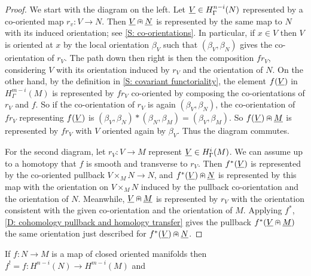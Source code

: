 \begin{proof}
	We start with the diagram on the left.
	Let $\underline{V} \in H^{n-i}_\Gamma(N)$ represented by a co-oriented map $r_v \colon V \to N$.
	Then $\underline{V}\nplus\underline{N}$ is represented by the same map to $N$ with its induced orientation; see \cref{S: co-orientations}.
	In particular, if $x \in V$ then $V$ is oriented at $x$ by the local orientation $\beta_V$ such that $(\beta_V,\beta_N)$ gives the co-orientation of $r_V$.
	The path down then right is then the composition $fr_V$, considering $V$ with its orientation induced by $r_V$ and the orientation of $N$.
	On the other hand, by the definition in \cref{S: covariant functoriality}, the element $f(\underline{V})$ in $H^{m-i}_\Gamma(M)$ is represented by $fr_V$ co-oriented by composing the co-orientations of $r_V$ and $f$.
	So if the co-orientation of $r_V$ is again $(\beta_V,\beta_N)$, the co-orientation of $fr_V$ representing $f(\underline{V})$ is $(\beta_V,\beta_N)*(\beta_N,\beta_M) = (\beta_V,\beta_M)$.
	So $f(\underline{V})\nplus \underline{M}$ is represented by $fr_V$ with $V$ oriented again by $\beta_V$.
	Thus the diagram commutes.

	For the second diagram, let $r_V \colon V \to M$ represent $\underline{V} \in H^{i}_\Gamma(M)$.
	We can assume up to a homotopy that $f$ is smooth and transverse to $r_V$.
	Then $f^*(\underline{V})$ is represented by the co-oriented pullback $V \times_M N \to N$, and $f^*(\underline{V})\nplus\underline{N}$ is represented by this map with the orientation on $V \times_M N$ induced by the pullback co-orientation and the orientation of $N$.
	Meanwhile, $\underline{V}\nplus \underline{M}$ is represented by $r_V$ with the orientation consistent with the given co-orientation and the orientation of $M$.
	Applying $f^*$, \cref{D: cohomology pullback and homology transfer} gives the pullback $f^*(\underline{V}\nplus \underline{M})$ the same orientation just described for $f^*(\underline{V})\nplus\underline{N}$.
\end{proof}

\begin{corollary}
	If $f \colon N \to M$ is a map of closed oriented manifolds then
	$f^! = f \colon H^{n-i}(N) \to H^{m-i}(M)$ and
\end{corollary}

